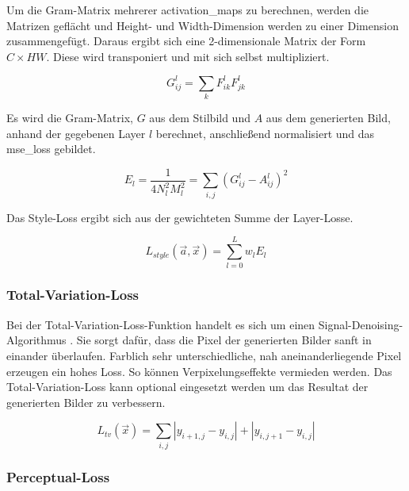 Um die Gram-Matrix mehrerer \gls{activation_map}s zu berechnen, werden die Matrizen geflächt und Height- und Width-Dimension werden zu einer Dimension zusammengefügt. Daraus ergibt sich eine 2-dimensionale Matrix der Form $ C \times HW $. Diese wird transponiert und mit sich selbst multipliziert.

\begin{equation}
	\label{eq:gram_matrix_1}
	G_{ij}^{l} = \sum_{k} F_{ik}^{l} F_{jk}^{l}
\end{equation}

Es wird die Gram-Matrix, $ G $ aus dem Stilbild und $ A $ aus dem generierten Bild, anhand der gegebenen Layer $ l $ berechnet, anschließend normalisiert und das \gls{mse_loss} gebildet.

\begin{equation}
	\label{eq:gram_matrix_2}
	E_{l} = \frac{1}{4N_{l}^{2} M_{l}^2} = \sum_{i, j} ( G_{ij}^{l} - A_{ij}^{l} )^2
\end{equation}

Das Style-Loss ergibt sich aus der gewichteten Summe der Layer-Losse.

\begin{equation}
	\label{eq:style_loss}
	L_{style} ( \vec{a}, \vec{x} ) = \sum_{l=0}^{L} w_{l} E_{l}
\end{equation}

\subsubsection{Total-Variation-Loss}
\label{sec:total_variation_Loss}

Bei der Total-Variation-Loss-Funktion handelt es sich um einen Signal-Denoising-Algorithmus \cite{RUDIN1992259, DBLP:journals/corr/EstrelaMS16}. Sie sorgt dafür, dass die Pixel der generierten Bilder sanft in einander überlaufen. Farblich sehr unterschiedliche, nah aneinanderliegende Pixel erzeugen ein hohes Loss. So können Verpixelungseffekte vermieden werden. Das Total-Variation-Loss kann optional eingesetzt werden um das Resultat der generierten Bilder zu verbessern.

\begin{equation}
	\label{eq:total_variation_loss}
	L_{tv} ( \vec{x} ) = \sum_{i,j} | y_{i + 1, j} - y_{i, j} | + | y_{i, j + 1} - y_{i,j} |
\end{equation}

\subsubsection{Perceptual-Loss}
\label{sec:perceptual_loss}

